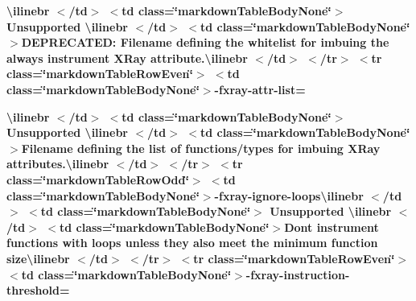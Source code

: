 \begin{longtabu}
{\bfseries{{\ttfamily \textbackslash{}ilinebr \texorpdfstring{$<$}{<}/td\texorpdfstring{$>$}{>} \texorpdfstring{$<$}{<}td class=\char`\"{}markdown\+Table\+Body\+None\char`\"{}\texorpdfstring{$>$}{>} Unsupported \textbackslash{}ilinebr \texorpdfstring{$<$}{<}/td\texorpdfstring{$>$}{>} \texorpdfstring{$<$}{<}td class=\char`\"{}markdown\+Table\+Body\+None\char`\"{}\texorpdfstring{$>$}{>}}DEPRECATED\+: Filename defining the whitelist for imbuing the \textquotesingle{}always instrument\textquotesingle{} XRay attribute.{\ttfamily \textbackslash{}ilinebr \texorpdfstring{$<$}{<}/td\texorpdfstring{$>$}{>} \texorpdfstring{$<$}{<}/tr\texorpdfstring{$>$}{>} \texorpdfstring{$<$}{<}tr class=\char`\"{}markdown\+Table\+Row\+Even\char`\"{}\texorpdfstring{$>$}{>} \texorpdfstring{$<$}{<}td class=\char`\"{}markdown\+Table\+Body\+None\char`\"{}\texorpdfstring{$>$}{>}}-\/fxray-\/attr-\/list= }}

{\bfseries{{\ttfamily \textbackslash{}ilinebr \texorpdfstring{$<$}{<}/td\texorpdfstring{$>$}{>} \texorpdfstring{$<$}{<}td class=\char`\"{}markdown\+Table\+Body\+None\char`\"{}\texorpdfstring{$>$}{>} Unsupported \textbackslash{}ilinebr \texorpdfstring{$<$}{<}/td\texorpdfstring{$>$}{>} \texorpdfstring{$<$}{<}td class=\char`\"{}markdown\+Table\+Body\+None\char`\"{}\texorpdfstring{$>$}{>}}Filename defining the list of functions/types for imbuing XRay attributes.{\ttfamily \textbackslash{}ilinebr \texorpdfstring{$<$}{<}/td\texorpdfstring{$>$}{>} \texorpdfstring{$<$}{<}/tr\texorpdfstring{$>$}{>} \texorpdfstring{$<$}{<}tr class=\char`\"{}markdown\+Table\+Row\+Odd\char`\"{}\texorpdfstring{$>$}{>} \texorpdfstring{$<$}{<}td class=\char`\"{}markdown\+Table\+Body\+None\char`\"{}\texorpdfstring{$>$}{>}}-\/fxray-\/ignore-\/loops{\ttfamily \textbackslash{}ilinebr \texorpdfstring{$<$}{<}/td\texorpdfstring{$>$}{>} \texorpdfstring{$<$}{<}td class=\char`\"{}markdown\+Table\+Body\+None\char`\"{}\texorpdfstring{$>$}{>} Unsupported \textbackslash{}ilinebr \texorpdfstring{$<$}{<}/td\texorpdfstring{$>$}{>} \texorpdfstring{$<$}{<}td class=\char`\"{}markdown\+Table\+Body\+None\char`\"{}\texorpdfstring{$>$}{>}}Don\textquotesingle{}t instrument functions with loops unless they also meet the minimum function size{\ttfamily \textbackslash{}ilinebr \texorpdfstring{$<$}{<}/td\texorpdfstring{$>$}{>} \texorpdfstring{$<$}{<}/tr\texorpdfstring{$>$}{>} \texorpdfstring{$<$}{<}tr class=\char`\"{}markdown\+Table\+Row\+Even\char`\"{}\texorpdfstring{$>$}{>} \texorpdfstring{$<$}{<}td class=\char`\"{}markdown\+Table\+Body\+None\char`\"{}\texorpdfstring{$>$}{>}}-\/fxray-\/instruction-\/threshold= }}


\end{longtabu}
